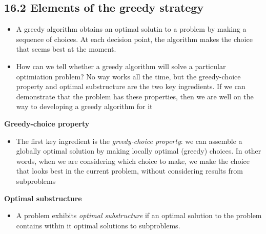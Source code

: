 \documentclass{report}
\begin{document}
\subsection*{16.2 Elements of the greedy strategy}
\begin{itemize}
    \item A greedy algorithm obtains an optimal solutin to a problem by making a sequence of choices. At each decision point, the algorithm makes the choice that seems best at the moment.
    \item How can we tell whether a greedy algorithm will solve a particular optimiation problem? No way works all the time, but the greedy-choice property and optimal substructure are the two key ingredients. If we can demonstrate that the problem has these properties, then we are well on the way to developing a greedy algorithm for it
\end{itemize}
\textbf{Greedy-choice property}
\begin{itemize}
    \item The first key ingredient is the \textit{greedy-choice property}: we can assemble a globally optimal solution by making locally optimal (greedy) choices. In other words, when we are considering which choice to make, we make the choice that looks best in the current problem, without considering results from subproblems
\end{itemize}
\textbf{Optimal substructure}
\begin{itemize}
    \item A problem exhibits \textit{optimal substructure} if an optimal solution to the problem contains within it optimal solutions to subproblems.
\end{itemize}
\end{document}
